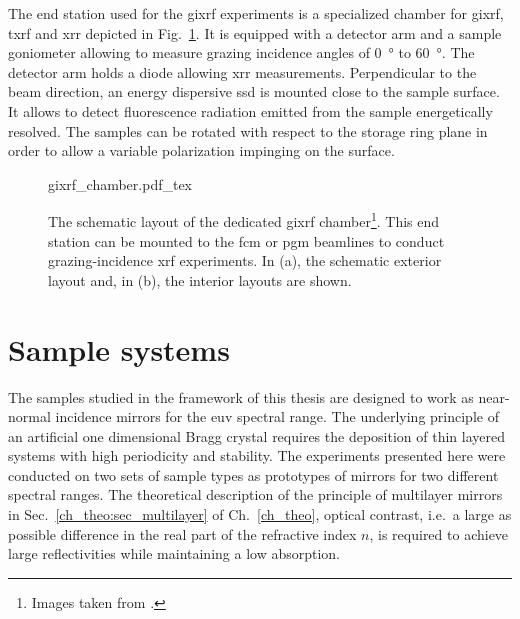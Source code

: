 The end station used for the \gls{gixrf} experiments is a specialized chamber for \gls{gixrf}, \gls{txrf} and \gls{xrr} \cite{lubeck_novel_2013} depicted in Fig.~\ref{ch_exp:fig_gixrf_chamber}. It is equipped with a detector arm and a sample goniometer allowing to measure grazing incidence angles of \SI{0}{\degree} to \SI{60}{\degree}. The detector arm holds a diode allowing \gls{xrr} measurements. Perpendicular to the beam direction, an energy dispersive \gls{ssd} is mounted close to the sample surface. It allows to detect fluorescence radiation emitted from the sample energetically resolved. The samples can be rotated with respect to the storage ring plane in order to allow a variable polarization impinging on the surface.



\begin{figure}[htb]
    \def\svgwidth{\textwidth}
    {gixrf_chamber.pdf_tex}
    \caption[The GIXRF chamber.]{The schematic layout of the dedicated \gls{gixrf} chamber\footnote{Images taken from \textcite{lubeck_novel_2013}.}. This end station can be mounted to the \gls{fcm} or \gls{pgm} beamlines to conduct grazing-incidence \gls{xrf} experiments. In (a), the schematic exterior layout and, in (b), the interior layouts are shown.}
    \label{ch_exp:fig_gixrf_chamber}
\end{figure}

\section{Sample systems}
The samples studied in the framework of this thesis are designed to work as near-normal incidence mirrors for the \gls{euv} spectral range. The underlying principle of an artificial one dimensional Bragg crystal requires the deposition of thin layered systems with high periodicity and stability. The experiments presented here were conducted on two sets of sample types as prototypes of mirrors for two different spectral ranges. The theoretical description of the principle of multilayer mirrors in Sec.~\ref{ch_theo:sec_multilayer} of Ch.~\ref{ch_theo}, optical contrast, i.e.~a large as possible difference in the real part of the refractive index $n$, is required to achieve large reflectivities while maintaining a low absorption.



